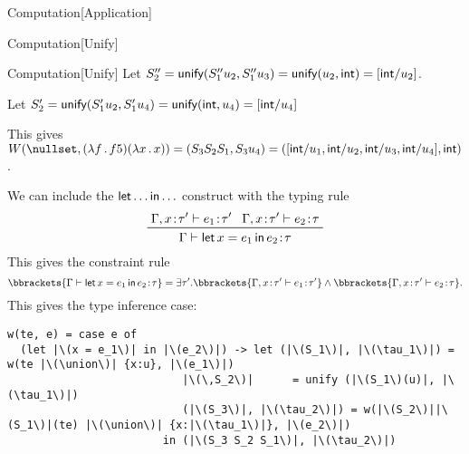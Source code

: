 \documentclass[class=scrartcl]{standalone}
\begin{document}
\begin{example}
\begin{adhoctheorem*}{Computation}[Application]
\begin{adhoctheorem*}{Computation}[Unify]
\begin{adhoctheorem*}{Computation}[Unify]
        Let \(S_2'' = \operatorname{\textsf{unify}}(S_1'' u_2, S_1'' u_3)
                    = \operatorname{\textsf{unify}}(u_2, \textsf{int})
                    = [\textsf{int} / u_2]\).
      \end{adhoctheorem*}

      Let \(S_2' = \operatorname{\textsf{unify}}(S_1' u_2, S_1' u_4)
                 = \operatorname{\textsf{unify}}(\textsf{int}, u_4)
                 = [\textsf{int} / u_4]\)
    \end{adhoctheorem*}
  \end{adhoctheorem*}
  
  This gives \(W(\nullset, (\plambda{f}{f 5})(\plambda{x}{x}))
                 = (S_3 S_2 S_1, S_3 u_4)
                 = ([ \pint / u_1
                    , \pint / u_2
                    , \pint / u_3
                    , \pint / u_4
                    ], \pint)\).
\end{example}

We can include the \(\operatorname{\textsf{let}}{\dots}\operatorname{\textsf{in}}{\dots}\) construct with the typing rule
\[
  \prftree{\Gamma, x \of \tau' \vdash e_1 \of \tau'}
          {\Gamma, x \of \tau' \vdash e_2 \of \tau}
          {\Gamma \vdash \pletin{x = e_1}{e_2} \of \tau}
\]
This gives the constraint rule
\[
  \bbrackets{\Gamma \vdash \pletin{x = e_1}{e_2} \of \tau}
    = \exists \tau'. \bbrackets{\Gamma, x \of \tau' \vdash e_1 \of \tau'} \land
                     \bbrackets{\Gamma, x \of \tau' \vdash e_2 \of \tau}.
\]
This gives the type inference case:
\begin{verbatim}
w(te, e) = case e of
  (let |\(x = e_1\)| in |\(e_2\)|) -> let (|\(S_1\)|, |\(\tau_1\)|) = w(te |\(\union\)| {x:u}, |\(e_1\)|)
                           |\(\,S_2\)|      = unify (|\(S_1\)(u)|, |\(\tau_1\)|)
                           (|\(S_3\)|, |\(\tau_2\)|) = w(|\(S_2\)||\(S_1\)|(te) |\(\union\)| {x:|\(\tau_1\)|}, |\(e_2\)|)
                        in (|\(S_3 S_2 S_1\)|, |\(\tau_2\)|)
\end{verbatim}
\end{document}
